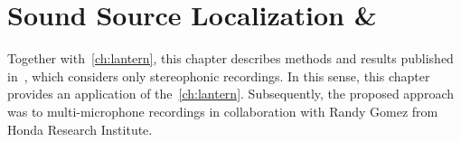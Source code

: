 \chapter{Sound Source Localization \& }\label{chap:mirage}


 \synopsisChMirage

\mynewline
Together with~\cref{ch:lantern}, this chapter describes methods and results published in~, which considers only stereophonic recordings.
In this sense, this chapter provides an application of the~\cref{ch:lantern}.
Subsequently, the proposed approach was to multi-microphone recordings in collaboration with Randy Gomez from Honda Research Institute.







